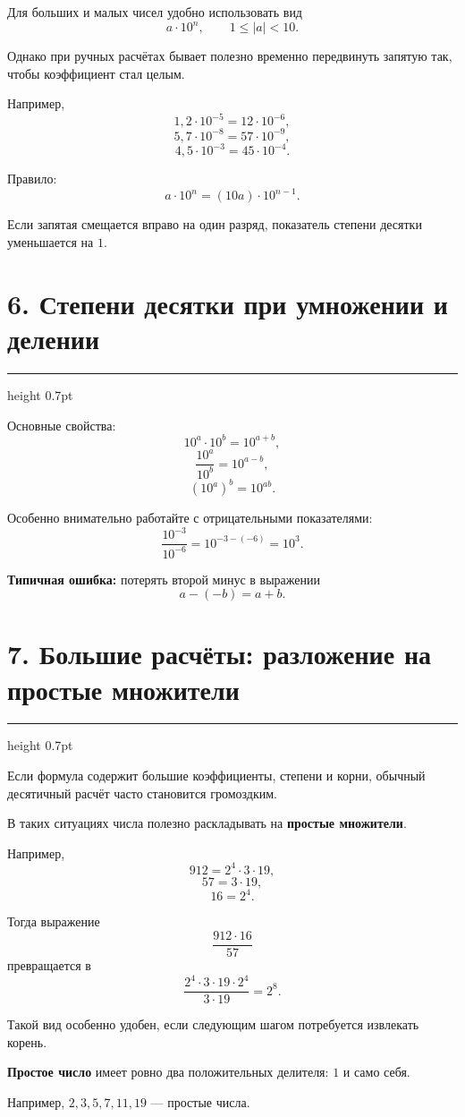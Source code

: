 \documentclass[a4paper,12pt]{article}
\newcommand{\sectionline}{%
    \par\vspace{0.15em}
    {\color{lightaccent}\hrule height 0.7pt}
    \vspace{0.7em}
}
\newcommand{\key}[1]{\textcolor{darkaccent}{\textbf{#1}}}
\begin{document}
Для больших и малых чисел удобно использовать вид
\[
a\cdot10^n,
\qquad
1\le |a|<10.
\]

Однако при ручных расчётах бывает полезно временно передвинуть запятую так,
чтобы коэффициент стал целым.

Например,
\[
1,2\cdot10^{-5}=12\cdot10^{-6},
\]
\[
5,7\cdot10^{-8}=57\cdot10^{-9},
\]
\[
4,5\cdot10^{-3}=45\cdot10^{-4}.
\]

Правило:
\[
a\cdot10^n=(10a)\cdot10^{n-1}.
\]

Если запятая смещается вправо на один разряд, показатель степени десятки
уменьшается на \(1\).

\section*{\textcolor{darkaccent}{6. Степени десятки при умножении и делении}}

\sectionline

Основные свойства:
\[
10^a\cdot10^b=10^{a+b},
\]
\[
\frac{10^a}{10^b}=10^{a-b},
\]
\[
(10^a)^b=10^{ab}.
\]

Особенно внимательно работайте с отрицательными показателями:
\[
\frac{10^{-3}}{10^{-6}}
=
10^{-3-(-6)}
=
10^3.
\]

\key{Типичная ошибка:} потерять второй минус в выражении
\[
a-(-b)=a+b.
\]

\section*{\textcolor{darkaccent}{7. Большие расчёты: разложение на простые множители}}

\sectionline

Если формула содержит большие коэффициенты, степени и корни, обычный
десятичный расчёт часто становится громоздким.

В таких ситуациях числа полезно раскладывать на \textbf{простые множители}.

Например,
\[
912=2^4\cdot3\cdot19,
\]
\[
57=3\cdot19,
\]
\[
16=2^4.
\]

Тогда выражение
\[
\frac{912\cdot16}{57}
\]
превращается в
\[
\frac{
2^4\cdot3\cdot19\cdot2^4
}{
3\cdot19
}
=
2^8.
\]

Такой вид особенно удобен, если следующим шагом потребуется извлекать корень.

\key{Простое число} имеет ровно два положительных делителя: \(1\) и само
себя.

Например, \(2,3,5,7,11,19\) --- простые числа.
\end{document}
